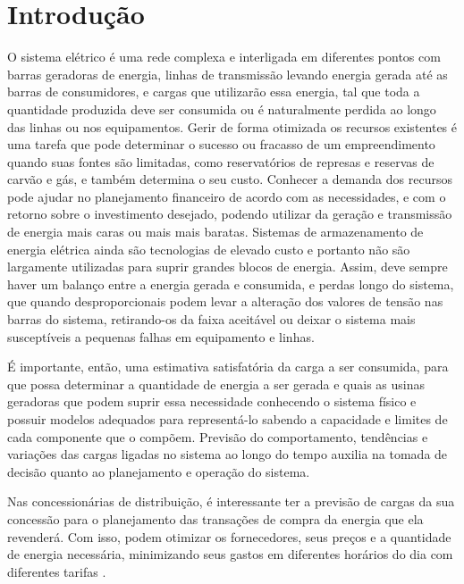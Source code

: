 \documentclass[
	12pt,				%
	oneside,			%
	a4paper,			%
	english,			%
	brazil				%
	]{abntex2}
\begin{document}
\chapter{Introdução}
	O sistema elétrico é uma rede complexa e interligada em diferentes pontos com barras geradoras de energia, linhas de transmissão levando energia gerada até as barras de consumidores, e cargas que utilizarão essa energia, tal que toda a quantidade produzida deve ser consumida ou é naturalmente perdida ao longo das linhas ou nos equipamentos. Gerir de forma otimizada os recursos existentes é uma tarefa que pode determinar o sucesso ou fracasso de um empreendimento quando suas fontes são limitadas, como reservatórios de represas e reservas de carvão e gás, e também determina o seu custo. Conhecer a demanda dos recursos pode ajudar no planejamento financeiro de acordo com as necessidades, e com o retorno sobre o investimento desejado, podendo utilizar da geração e transmissão de energia mais caras ou mais mais baratas. 
	Sistemas de armazenamento de energia elétrica ainda são tecnologias de elevado custo e portanto não são largamente utilizadas para suprir grandes blocos de energia. Assim, deve sempre haver um balanço entre a energia gerada e consumida, e perdas longo do sistema, que quando desproporcionais podem levar a alteração dos valores de tensão nas barras do sistema, retirando-os da faixa aceitável ou deixar o sistema mais susceptíveis a pequenas falhas em equipamento e linhas. 
	
	
	É importante, então, uma estimativa satisfatória da carga a ser consumida, para que possa determinar a quantidade de energia a ser gerada e quais as usinas geradoras que podem suprir essa necessidade conhecendo o sistema físico e possuir modelos adequados para representá-lo sabendo a capacidade e limites de cada componente que o compõem. Previsão do comportamento, tendências e variações das cargas ligadas no sistema ao longo do tempo auxilia na tomada de decisão quanto ao planejamento e operação do sistema. 	
	
	Nas concessionárias de distribuição, é interessante ter a previsão de cargas da sua concessão para o planejamento das transações de compra da energia que ela revenderá. Com isso, podem otimizar os fornecedores, seus preços e a quantidade de energia necessária, minimizando seus gastos em diferentes horários do dia com diferentes tarifas \cite{ReviewSmartMeterLoadForecastingTechniques}. 
	
\end{document}
